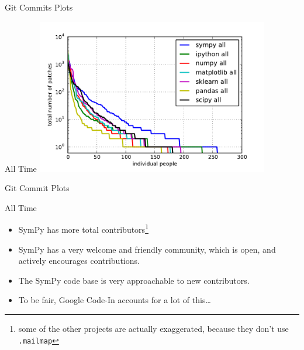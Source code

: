 \documentclass[xcolor=svgnames]{beamer}
\begin{document}
%

\begin{frame}{Git Commits Plots}
  \begin{block}{All Time}
    \includegraphics[width=4in]{commits-all.pdf}
  \end{block}
\end{frame}

\begin{frame}{Git Commit Plots}
  \begin{block}{All Time}
    \begin{itemize}
    \item SymPy has more total contributors\footnote{some of the other projects are actually exaggerated,
        because they don't use \texttt{.mailmap}}
    \item SymPy has a very welcome and friendly community, which is open, and
      actively encourages contributions.
    \item The SymPy code base is very approachable to new contributors.
    \item To be fair, Google Code-In accounts for a lot of this\ldots
    \end{itemize}
  \end{block}
\end{frame}
\end{document}
